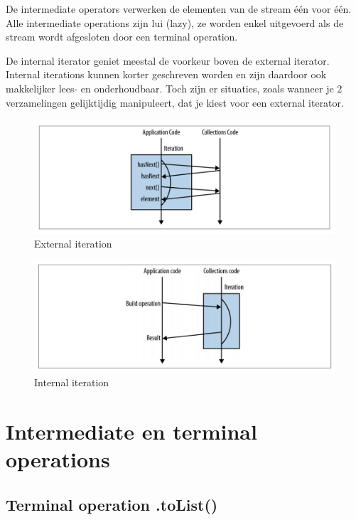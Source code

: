 De intermediate operators verwerken de elementen van de stream \'e\'en voor \'e\'en. Alle intermediate operations zijn lui (lazy), ze worden enkel uitgevoerd als de stream wordt afgesloten door een terminal operation.

De internal iterator geniet meestal de voorkeur boven de external iterator.  Internal iterations kunnen korter geschreven worden en zijn daardoor ook makkelijker lees- en onderhoudbaar. Toch zijn er situaties, zoals wanneer je 2 verzamelingen gelijktijdig manipuleert, dat je kiest voor een external iterator.

\begin{figure}[H]
  \includegraphics[width=\linewidth]{images/h6/external_iteration.png}
  \caption{External iteration}
  \label{fig:external_iteration}
\end{figure}

\begin{figure}[H]
  \includegraphics[width=\linewidth]{images/h6/internal_iteration.png}
  \caption{Internal iteration}
  \label{fig:internal_iteration}
\end{figure}



\section{Intermediate en terminal operations}

\subsection{Terminal operation .toList()}

